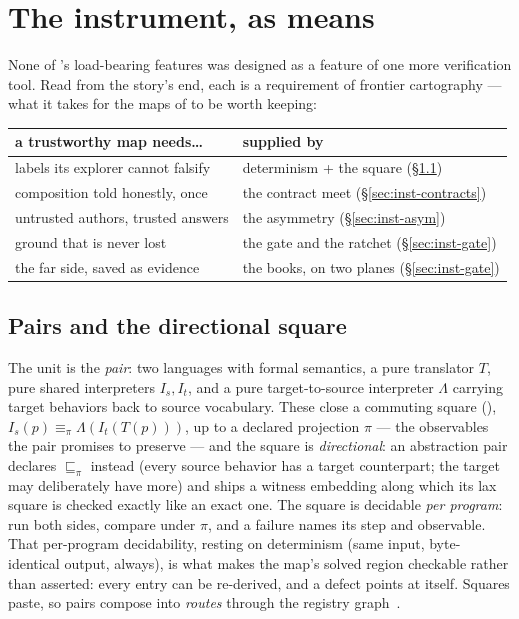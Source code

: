 
\section{The instrument, as means}
\label{sec:instrument}

None of \hg's load-bearing features was designed as a feature of one
more verification tool. Read from the story's end, each is a
requirement of frontier cartography — what it takes for the maps of
 to be worth keeping:

\begin{center}
\footnotesize
\begin{tabular}{@{}ll@{}}
\toprule
a trustworthy map needs\ldots & supplied by \\
\midrule
labels its explorer cannot falsify & determinism + the square (\S\ref{sec:inst-pairs}) \\
composition told honestly, once & the contract meet (\S\ref{sec:inst-contracts}) \\
untrusted authors, trusted answers & the asymmetry (\S\ref{sec:inst-asym}) \\
ground that is never lost & the gate and the ratchet (\S\ref{sec:inst-gate}) \\
the far side, saved as evidence & the books, on two planes (\S\ref{sec:inst-gate}) \\
\bottomrule
\end{tabular}
\end{center}

\subsection{Pairs and the directional square}
\label{sec:inst-pairs}

The unit is the \emph{pair}: two languages with formal semantics, a
pure translator $T$, pure shared interpreters $I_s, I_t$, and a pure
target-to-source interpreter $\Lambda$ carrying target behaviors back
to source vocabulary. These close a commuting square
(),
$I_s(p) \equiv_\pi \Lambda(I_t(T(p)))$, up to a declared projection
$\pi$ — the observables the pair promises to preserve — and the
square is \emph{directional}: an abstraction pair declares
$\sqsubseteq_\pi$ instead (every source behavior has a target
counterpart; the target may deliberately have more) and ships a
witness embedding along which its lax square is checked exactly like
an exact one. The square is decidable \emph{per program}: run both
sides, compare under $\pi$, and a failure names its step and
observable. That per-program decidability, resting on determinism
(same input, byte-identical output, always), is what makes the map's
solved region checkable rather than asserted: every entry can be
re-derived, and a defect points at itself. Squares paste, so pairs
compose into \emph{routes} through the registry
graph~\citep{hurdygurdy2026calculus}.

